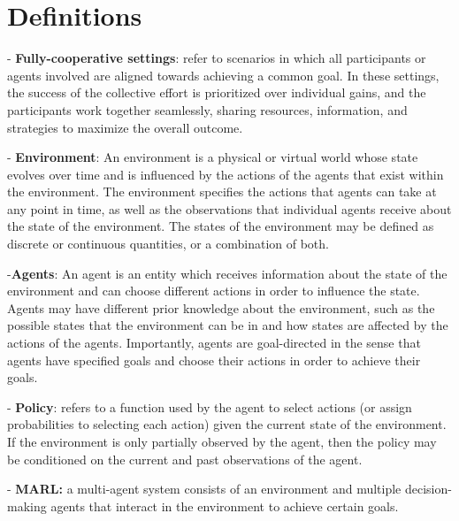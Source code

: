 
\chapter{Definitions}

\label{app:definitions}

- \textbf{Fully-cooperative settings}: refer to scenarios in which all participants or agents involved are aligned towards achieving a common goal. In these settings, the success of the collective effort is prioritized over individual gains, and the participants work together seamlessly, sharing resources, information, and strategies to maximize the overall outcome.




- \textbf{Environment}: An environment is a physical or virtual world whose state
evolves over time and is influenced by the actions of the agents that exist
within the environment. The environment specifies the actions that agents
can take at any point in time, as well as the observations that individual
agents receive about the state of the environment. The states of the environment may be defined as discrete or continuous quantities, or a combination
of both.

-\textbf{Agents}: An agent is an entity which receives information about the state of the
environment and can choose different actions in order to influence the state.
Agents may have different prior knowledge about the environment, such as
the possible states that the environment can be in and how states are affected
by the actions of the agents. Importantly, agents are goal-directed in the
sense that agents have specified goals and choose their actions in order to
achieve their goals.

- \textbf{Policy}: refers to a function used by the agent to select actions (or assign probabilities to selecting each action) given the current state of the environment. If the environment is only partially observed
by the agent, then the policy may be conditioned on the current and past
observations of the agent.

- \textbf{MARL:} a multi-agent system consists of an environment and multiple decision-making
agents that interact in the environment to achieve certain goals.

